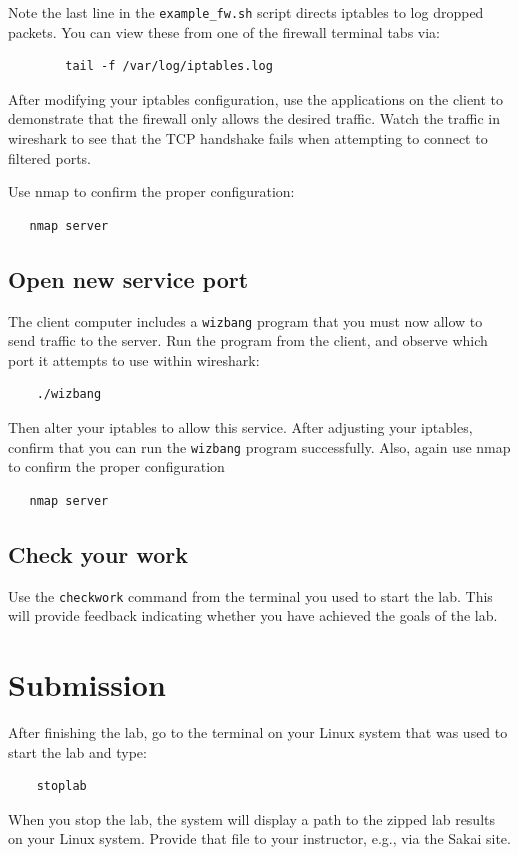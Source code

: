 Note the last line in the {\tt example\_fw.sh} script directs iptables
to log dropped packets.  You can view these from one of the firewall terminal
tabs via:
\begin{verbatim}
        tail -f /var/log/iptables.log
\end{verbatim}

After modifying your iptables configuration, use the applications on the client to
demonstrate that the firewall only allows the desired traffic.
Watch the traffic in wireshark to see that the TCP handshake fails
when attempting to connect to filtered ports.

Use nmap to confirm the proper configuration:
\begin{verbatim}
   nmap server
\end{verbatim}


\subsection{Open new service port}
The client computer includes a {\tt wizbang} program that you must now allow to send
traffic to the server.  Run the program from the client, and observe which port it
attempts to use within wireshark:
\begin{verbatim}
    ./wizbang
\end{verbatim}
\noindent Then alter your iptables to allow this service.  After adjusting your iptables, 
confirm that you can run the {\tt wizbang} program successfully.
Also, again use nmap to confirm the proper configuration
\begin{verbatim}
   nmap server
\end{verbatim}

\subsection{Check your work}
Use the {\tt checkwork} command from the terminal you used to start the lab.  This will
provide feedback indicating whether you have achieved the goals of the lab.

\section{Submission}
After finishing the lab, go to the terminal on your Linux system that was used to start the lab and type:
\begin{verbatim}
    stoplab 
\end{verbatim}
When you stop the lab, the system will display a path to the zipped lab results on your Linux system.  Provide that file to 
your instructor, e.g., via the Sakai site.

\copyrightnotice


